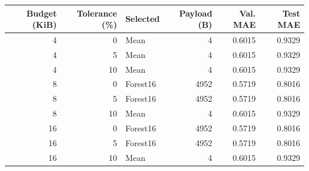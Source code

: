 \begin{tabular}{rrlrrr}
\toprule
Budget (KiB) & Tolerance (\%) & Selected & Payload (B) & Val. MAE & Test MAE \\
\midrule
4 & 0 & Mean & 4 & 0.6015 & 0.9329 \\
4 & 5 & Mean & 4 & 0.6015 & 0.9329 \\
4 & 10 & Mean & 4 & 0.6015 & 0.9329 \\
8 & 0 & Forest16 & 4952 & 0.5719 & 0.8016 \\
8 & 5 & Forest16 & 4952 & 0.5719 & 0.8016 \\
8 & 10 & Mean & 4 & 0.6015 & 0.9329 \\
16 & 0 & Forest16 & 4952 & 0.5719 & 0.8016 \\
16 & 5 & Forest16 & 4952 & 0.5719 & 0.8016 \\
16 & 10 & Mean & 4 & 0.6015 & 0.9329 \\
\bottomrule
\end{tabular}